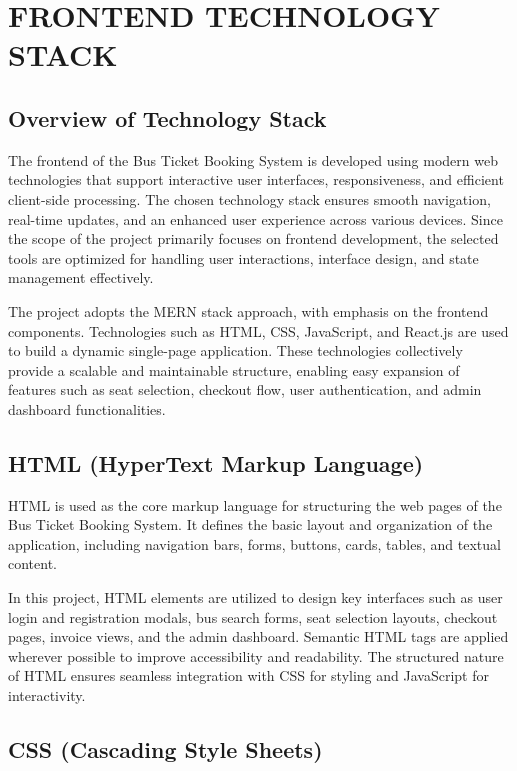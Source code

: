 \chapter{FRONTEND TECHNOLOGY STACK}

\section{Overview of Technology Stack}

The frontend of the Bus Ticket Booking System is developed using modern web technologies that support interactive user interfaces, responsiveness, and efficient client-side processing. The chosen technology stack ensures smooth navigation, real-time updates, and an enhanced user experience across various devices. Since the scope of the project primarily focuses on frontend development, the selected tools are optimized for handling user interactions, interface design, and state management effectively.

The project adopts the MERN stack approach, with emphasis on the frontend components. Technologies such as HTML, CSS, JavaScript, and React.js are used to build a dynamic single-page application. These technologies collectively provide a scalable and maintainable structure, enabling easy expansion of features such as seat selection, checkout flow, user authentication, and admin dashboard functionalities.

\section{HTML (HyperText Markup Language)}

HTML is used as the core markup language for structuring the web pages of the Bus Ticket Booking System. It defines the basic layout and organization of the application, including navigation bars, forms, buttons, cards, tables, and textual content.

In this project, HTML elements are utilized to design key interfaces such as user login and registration modals, bus search forms, seat selection layouts, checkout pages, invoice views, and the admin dashboard. Semantic HTML tags are applied wherever possible to improve accessibility and readability. The structured nature of HTML ensures seamless integration with CSS for styling and JavaScript for interactivity.

\section{CSS (Cascading Style Sheets)}

